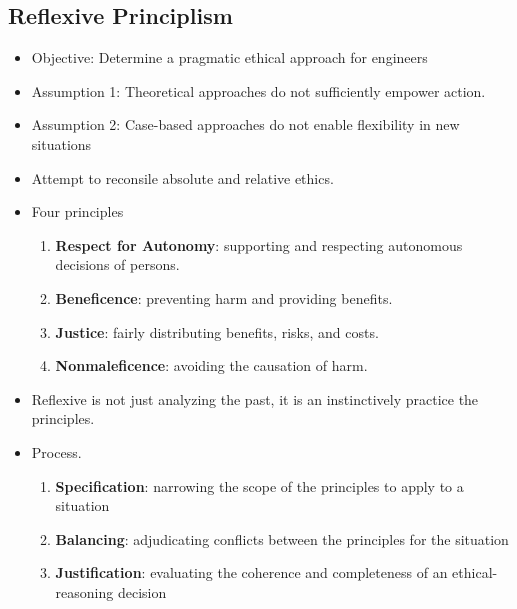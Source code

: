 \documentclass[a4paper]{article}
\numberwithin{equation}{section}
\begin{document}
\subsection{Reflexive Principlism}
\begin{itemize}
    \item Objective: Determine a pragmatic ethical approach for engineers
    \item Assumption 1: Theoretical approaches do not sufficiently empower action.
    \item Assumption 2: Case-based approaches do not enable flexibility in new situations
    \item Attempt to reconsile absolute and relative ethics. 
    \item Four principles
    \begin{enumerate}
        \item \textbf{Respect for Autonomy}: supporting and respecting autonomous decisions of persons.
        \item \textbf{Beneficence}: preventing harm and providing benefits.
        \item \textbf{Justice}: fairly distributing benefits, risks, and costs.
        \item \textbf{Nonmaleficence}: avoiding the causation of harm.
    \end{enumerate}
    \item Reflexive is not just analyzing the past, it is an instinctively practice the principles.
    \item Process.
    \begin{enumerate}
        \item \textbf{Specification}: narrowing the scope of the principles to apply to a situation
        \item \textbf{Balancing}: adjudicating conflicts between the principles for the situation
        \item \textbf{Justification}: evaluating the coherence and completeness of an ethical-reasoning decision
    \end{enumerate}
\end{itemize}
\end{document}
